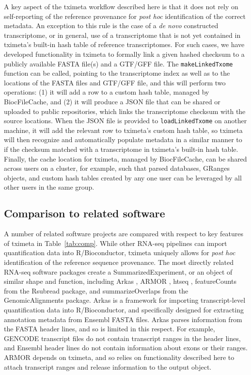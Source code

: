 \documentclass[10pt,letterpaper]{article}
\begin{document}
A key aspect of the tximeta workflow described here is that it does
not rely on self-reporting of the reference provenance for
\textit{post hoc} identification of the correct metadata. An exception
to this rule is the case of a \textit{de novo} constructed
transcriptome, or in general, use of a transcriptome that is not yet
contained in tximeta's built-in hash table of reference
transcriptomes. For such cases, we have developed functionality in
tximeta to formally link a given hashed checksum to a publicly
available FASTA file(s) and a GTF/GFF file. The
\texttt{makeLinkedTxome} function can be called, pointing to the
transcriptome index as well as to the locations of the FASTA files and
GTF/GFF file, and this will perform two operations:
(1) it will add a row to a custom hash
table, managed by BiocFileCache, and (2) it will produce a JSON file
that can be shared or uploaded to public repositories,
which links the transcriptome checksum
with the source locations. When the JSON file is provided to
\texttt{loadLinkedTxome} on another machine, it will add the relevant
row to tximeta's custom hash table, so tximeta will then recognize and
automatically populate metadata in a similar manner to if the checksum
matched with a transcriptome in tximeta's built-in hash
table. Finally, the cache location for tximeta, managed by
BiocFileCache, can be shared across users on a cluster, for example,
such that parsed databases, GRanges objects, and custom hash tables
created by any one user can be leveraged by all other users in the
same group.

\subsection*{Comparison to related software}

A number of related software projects are compared with respect to
key features of tximeta in Table~\ref{tab:comp}. While other
RNA-seq pipelines can import quantification data into
R/Bioconductor, tximeta uniquely allows for \textit{post hoc}
identification of the reference sequence provenance.  The most
directly related RNA-seq software packages create a
SummarizedExperiment, or an object of similar shape and function,
including
Arkas \cite{arkas}, ARMOR \cite{Orjuelag2019}, htseq \cite{htseq},
featureCounts \cite{featurecounts} from the Rsubread package,
and summarizeOverlaps \cite{granges} from the GenomicAlignments
package.
Arkas is a framework for importing transcript-level quantification
data into R/Bioconductor, and specifically designed for extracting
annotation metadata from Ensembl FASTA files.
Arkas parses information from the FASTA header lines, and so is
limited in this respect. For example, GENCODE transcript files do
not contain transcript ranges in the header lines, and Ensembl
header lines do not contain information about exons or their ranges.
ARMOR depends on tximeta, and so relies on functionality described
here to attach transcript ranges and release information to the
output object.
\end{document}
